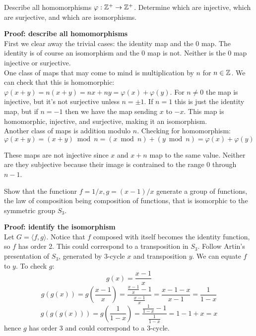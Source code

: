 \documentclass{article}
\begin{document}
\begin{problem}
Describe all homomorphisms $\varphi: \mathbb{Z}^+ \to \mathbb{Z}^+$. Determine which are injective, which are surjective, and which are isomorphisms.
\end{problem}

\textbf{Proof: describe all homomorphisms}
\\

First we clear away the trivial cases: the identity map and the 0 map. The identity is of course an isomorphism and the 0 map is not. Neither is the 0 map injective or surjective.
\\

One class of maps that may come to mind is multiplication by $n$ for $n \in \mathbb{Z}$. We can check that this is homomorphic: $\varphi(x + y) = n(x + y) = nx + ny = \varphi(x) + \varphi(y)$. For $n \neq 0$ the map is injective, but it's not surjective unless $n = \pm 1$. If $n = 1$ this is just the identity map, but if $n = -1$ then we have the map sending $x$ to $-x$. This map is homomorphic, injective, and surjective, making it an isomorphism.
\\

Another class of maps is addition modulo $n$. Checking for homomorphism:
$$\varphi(x + y) = (x + y) \bmod n = (x \bmod n) + (y \bmod n) = \varphi(x) + \varphi(y)$$

These maps are not injective since $x$ and $x + n$ map to the same value. Neither are they subjective because their image is contrained to the range 0 through $n - 1$.

\begin{problem}
Show that the functionr $f = 1/x, g = (x - 1)/x$ generate a group of functions, the law of composition being composition of functions, that is isomorphic to the symmetric group $S_3$.
\end{problem}

\textbf{Proof: identify the isomorphism}
\\

Let $G = \langle f, g \rangle$. Notice that $f$ composed with itself becomes the identity function, so $f$ has order 2. This could correspond to a transposition in $S_3$. Follow Artin's presentation of $S_3$, generated by 3-cycle $x$ and transposition $y$. We can equate $f$ to $y$. To check $g$:
$$g(x) = \frac{x - 1}{x}$$
$$g(g(x)) = g\left(\frac{x - 1}{x}\right) = \frac{\frac{x - 1}{x} - 1}{\frac{x - 1}{x}} = \frac{x - 1 - x}{x - 1} = \frac{1}{1-x}$$
$$g(g(g(x))) = g\left(\frac{1}{1 - x}\right) = \frac{\frac{1}{1 - x} - 1}{\frac{1}{1 - x}} = 1 - 1 + x = x$$
hence $g$ has order 3 and could correspond to a 3-cycle.
\\
\end{document}
